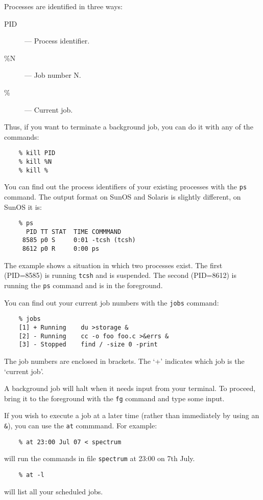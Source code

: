 \vspace*{5mm}

Processes are identified in three ways:
\begin{description}
\begin{description}
\item [PID] --- Process identifier.
\item [\%N] --- Job number N.
\item [\%] --- Current job.
\end{description}
\end{description}
Thus, if you want to terminate a background job, you can do it with any of
the commands:
\begin{verbatim}
    % kill PID
    % kill %N
    % kill %
\end{verbatim}
You can find out the process identifiers of your existing processes with the
{\tt ps} command.
The output format on SunOS and Solaris is slightly different, on SunOS it is:
\begin{verbatim}
    % ps
      PID TT STAT  TIME COMMMAND
     8585 p0 S     0:01 -tcsh (tcsh)
     8612 p0 R     0:00 ps
\end{verbatim}
The example shows a situation in which two processes exist.
The first (PID=8585) is running {\tt tcsh} and is suspended.
The second (PID=8612) is running the {\tt ps} command and is in the foreground.

You can find out your current job numbers with the {\tt jobs} command:
\begin{verbatim}
    % jobs
    [1] + Running    du >storage &
    [2] - Running    cc -o foo foo.c >&errs &
    [3] - Stopped    find / -size 0 -print
\end{verbatim}
The job numbers are enclosed in brackets.
The `+' indicates which job is the `current job'.

A background job will halt when it needs input from your terminal.
To proceed, bring it to the foreground with the {\tt fg} command and type some
input.

If you wish to execute a job at a later time (rather than immediately by using
an {\tt \&}), you can use the {\tt at} commmand.
For example:
\begin{verbatim}
    % at 23:00 Jul 07 < spectrum
\end{verbatim}
will run the commands in file {\tt spectrum} at 23:00 on 7th July.
\begin{verbatim}
    % at -l
\end{verbatim}
will list all your scheduled jobs.

